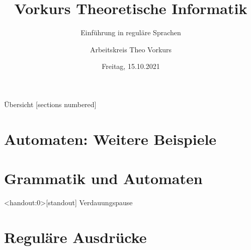 %
%
%
%



\title{Vorkurs Theoretische Informatik}
\subtitle{Einführung in reguläre Sprachen}
\date{Freitag, 15.10.2021}
\author{Arbeitskreis Theo Vorkurs}



\maketitle

\begin{frame}[fragile]{Übersicht}
    [sections numbered]
    \tableofcontents%
\end{frame}

\section{Automaten: Weitere Beispiele}



\section{Grammatik und Automaten}



\begin{frame}<handout:0>[standout]
    Verdauungspause
\end{frame}

\section{Reguläre Ausdrücke}

